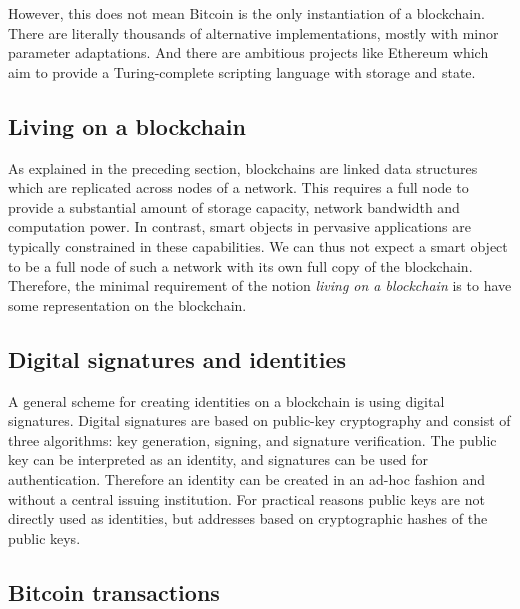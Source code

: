 \documentclass[10pt, conference,compsoc]{IEEEtran}
\begin{document}
  However, this does not mean Bitcoin is the only instantiation of a blockchain. There are literally thousands of alternative implementations, mostly with minor parameter adaptations. And there are ambitious projects like Ethereum \cite{buterin2014ethereum} which aim to provide a Turing-complete scripting language with storage and state. 

   \subsection{Living on a blockchain}

   As explained in the preceding section, blockchains are linked data structures which are replicated across nodes of a network. This requires a full node to provide a substantial amount of storage capacity, network bandwidth and computation power. In contrast, smart objects in pervasive applications are typically constrained in these capabilities. We can thus not expect a smart object to be a full node of such a network with its own full copy of the blockchain. Therefore, the minimal requirement of the notion \textit{living on a blockchain} is to have some representation on the blockchain.

   \subsection{Digital signatures and identities}
   \label{subsec:signatures}

   A general scheme for creating identities on a blockchain is using digital signatures. Digital signatures are based on public-key cryptography and consist of three algorithms: key generation, signing, and signature verification. The public key can be interpreted as an identity, and signatures can be used for authentication. Therefore an identity can be created in an ad-hoc fashion and without a central issuing institution. For practical reasons public keys are not directly used as identities, but addresses based on cryptographic hashes of the public keys.

   \subsection{Bitcoin transactions}
   \label{subsec:transactons}
\end{document}
